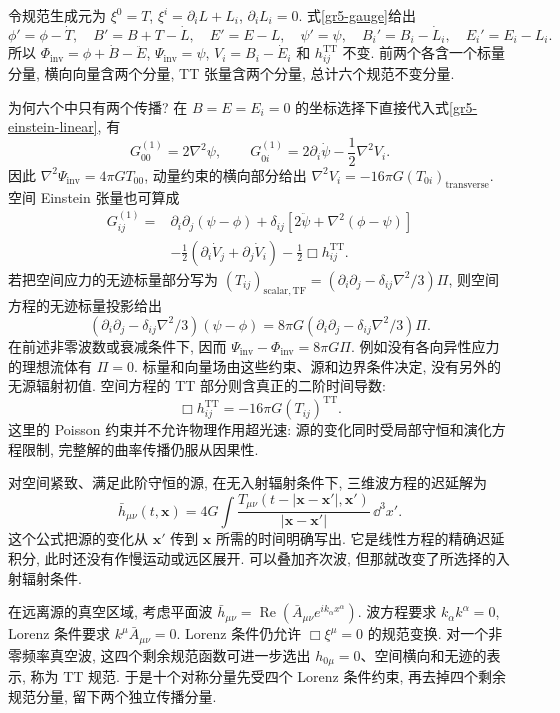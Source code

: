 令规范生成元为 $\xi^0=T$, $\xi^i=\partial_i L+L_i$, $\partial_iL_i=0$. 式\eqref{gr5-gauge}给出
\[
 \phi'=\phi-\dot T,\quad B'=B+T-\dot L,\quad E'=E-L,
 \quad \psi'=\psi,\quad B_i'=B_i-\dot L_i,\quad E_i'=E_i-L_i.
\]
所以 $\Phi_{\mathrm{inv}}=\phi+\dot B-\ddot E$, $\Psi_{\mathrm{inv}}=\psi$, $V_i=B_i-\dot E_i$ 和 $h^{\mathrm{TT}}_{ij}$ 不变. 前两个各含一个标量分量, 横向向量含两个分量, TT 张量含两个分量, 总计六个规范不变分量.

为何六个中只有两个传播? 在 $B=E=E_i=0$ 的坐标选择下直接代入式\eqref{gr5-einstein-linear}, 有
\[
 G^{(1)}_{00}=2\nabla^2\psi,\qquad
 G^{(1)}_{0i}=2\partial_i\dot\psi-\frac12\nabla^2 V_i.
\]
因此 $\nabla^2\Psi_{\mathrm{inv}}=4\pi G T_{00}$, 动量约束的横向部分给出 $\nabla^2V_i=-16\pi G(T_{0i})_{\mathrm{transverse}}$. 空间 Einstein 张量也可算成
\begin{align*}
 G^{(1)}_{ij}={}&\partial_i\partial_j(\psi-\phi)
       +\delta_{ij}[2\ddot\psi+\nabla^2(\phi-\psi)]\\
       &-\frac12(\partial_i\dot V_j+\partial_j\dot V_i)
       -\frac12\Box h^{\mathrm{TT}}_{ij}.
\end{align*}
若把空间应力的无迹标量部分写为
$(T_{ij})_{\mathrm{scalar,TF}}=(\partial_i\partial_j-\delta_{ij}\nabla^2/3)\Pi$, 则空间方程的无迹标量投影给出
\[
 (\partial_i\partial_j-\delta_{ij}\nabla^2/3)(\psi-\phi)
 =8\pi G(\partial_i\partial_j-\delta_{ij}\nabla^2/3)\Pi.
\]
在前述非零波数或衰减条件下, 因而 $\Psi_{\mathrm{inv}}-\Phi_{\mathrm{inv}}=8\pi G\Pi$. 例如没有各向异性应力的理想流体有 $\Pi=0$. 标量和向量场由这些约束、源和边界条件决定, 没有另外的无源辐射初值. 空间方程的 TT 部分则含真正的二阶时间导数:
\[
 \Box h^{\mathrm{TT}}_{ij}=-16\pi G(T_{ij})^{\mathrm{TT}}.
\]
这里的 Poisson 约束并不允许物理作用超光速: 源的变化同时受局部守恒和演化方程限制, 完整解的曲率传播仍服从因果性.


对空间紧致、满足此阶守恒的源, 在无入射辐射条件下, 三维波方程的迟延解为
\begin{equation}\label{gr5-retarded}
 \bar h_{\mu\nu}(t,\boldsymbol x)=4G\int
 \frac{T_{\mu\nu}(t-|\boldsymbol x-\boldsymbol x'|,\boldsymbol x')}
 {|\boldsymbol x-\boldsymbol x'|}\,\dd^3x'.
\end{equation}
这个公式把源的变化从 $\boldsymbol x'$ 传到 $\boldsymbol x$ 所需的时间明确写出. 它是线性方程的精确迟延积分, 此时还没有作慢运动或远区展开. 可以叠加齐次波, 但那就改变了所选择的入射辐射条件.

在远离源的真空区域, 考虑平面波 $\bar h_{\mu\nu}=\operatorname{Re}(\bar A_{\mu\nu}e^{ik_\alpha x^\alpha})$. 波方程要求 $k_\alpha k^\alpha=0$, Lorenz 条件要求 $k^\mu\bar A_{\mu\nu}=0$. Lorenz 条件仍允许 $\Box\xi^\mu=0$ 的规范变换. 对一个非零频率真空波, 这四个剩余规范函数可进一步选出 $h_{0\mu}=0$、空间横向和无迹的表示, 称为 TT 规范. 于是十个对称分量先受四个 Lorenz 条件约束, 再去掉四个剩余规范分量, 留下两个独立传播分量.

